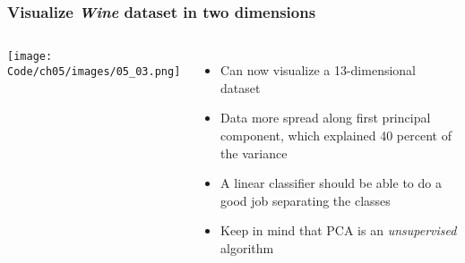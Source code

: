 \documentclass{beamer}
\begin{document}
\begin{frame}
  \frametitle{Visualize \textit{Wine} dataset in two dimensions}
  \begin{columns}[c]
    \texttt{[image: Code/ch05/images/05\_03.png]}
    \begin{itemize}
    \item Can now visualize a 13-dimensional dataset
    \item Data more spread along first principal component, which explained 40 percent of the variance
    \item A linear classifier should be able to do a good job separating the classes
    \item Keep in mind that PCA is an \textit{unsupervised} algorithm
    \end{itemize}
  \end{columns}
\end{frame}
\end{document}
